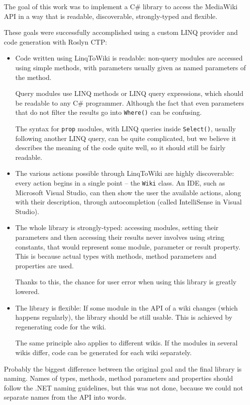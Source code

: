 \label{conclusion}

The goal of this work was to implement a C\# library to access the MediaWiki \ac{API}
in a way that is readable, discoverable, strongly-typed and flexible.

These goals were successfully accomplished using a custom \acs{LINQ} provider and code generation with Roslyn \ac{CTP}:

\begin{itemize}
\item Code written using LinqToWiki is readable:
non-query modules are accessed using simple methods,
with parameters usually given as named parameters of the method.

Query modules use \acs{LINQ} methods or \acs{LINQ} query expressions,
which should be readable to any C\# programmer.
Although the fact that even parameters that do not filter the results go into \lstinline{Where()} can be confusing.

The syntax for \texttt{prop} modules, with \acs{LINQ} queries inside \lstinline{Select()},
usually following another \acs{LINQ} query, can be quite complicated,
but we believe it describes the meaning of the code quite well,
so it should still be fairly readable.

\item The various actions possible through LinqToWiki are highly discoverable:
every action begins in a single point – the \lstinline{Wiki} class.
An \ac{IDE}, such as Microsoft Visual Studio,
can then show the user the available actions, along with their description,
through autocompletion (called IntelliSense in Visual Studio).

\item The whole library is strongly-typed:
accessing modules, setting their parameters and then accessing their results
never involves using string constants,
that would represent some module, parameter or result property.
This is because actual types with methods, method parameters and properties are used.

Thanks to this, the chance for user error when using this library is greatly lowered.

\item The library is flexible: If some module in the \ac{API} of a wiki changes
(which happens regularly), the library should be still usable.
This is achieved by regenerating code for the wiki.

The same principle also applies to different wikis.
If the modules in several wikis differ, code can be generated for each wiki separately.
\end{itemize}

\medskip

Probably the biggest difference between the original goal and the final library is naming.
Names of types, methods, method parameters and properties should follow the .NET naming guidelines,
but this was not done, because we could not separate names from the \ac{API} into words.

